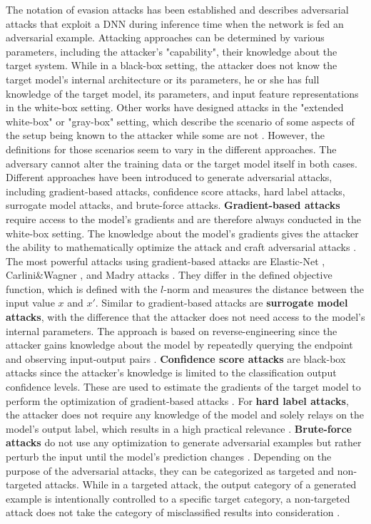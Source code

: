 The notation of evasion attacks has been established and describes adversarial attacks that exploit a DNN during inference time when the network is fed an adversarial example. 
Attacking approaches can be determined by various parameters, including the attacker's "capability", their knowledge about the target system. While in a black-box setting, the attacker does not know the target model's internal architecture or its parameters, he or she has full knowledge of the target model, its parameters, and input feature representations in the white-box setting. Other works have designed attacks in the "extended white-box" or "gray-box" setting, which describe the scenario of some aspects of the setup being known to the attacker while some are not \cite{vivek2018gray}. However, the definitions for those scenarios seem to vary in the different approaches.
The adversary cannot alter the training data or the target model itself in both cases.
Different approaches have been introduced to generate adversarial attacks, including gradient-based attacks, confidence score attacks, hard label attacks, surrogate model attacks, and brute-force attacks. \textbf{Gradient-based attacks} require access to the model's gradients and are therefore always conducted in the white-box setting. The knowledge about the model's gradients gives the attacker the ability to mathematically optimize the attack and craft adversarial attacks \cite{carlini2017adversarial}. The most powerful attacks using gradient-based attacks are Elastic-Net \cite{chen2017ead}, Carlini\&Wagner \cite{carlini2017adversarial}, and Madry attacks \cite{madry2017towards}. They differ in the defined objective function, which is defined with the $l$-norm and measures the distance between the input value \(x\) and \(x'\). Similar to gradient-based attacks are \textbf{surrogate model attacks}, with the difference that the attacker does not need access to the model's internal parameters. The approach is based on reverse-engineering since the attacker gains knowledge about the model by repeatedly querying the endpoint and observing input-output pairs \cite{uesato2018adversarial}. 
\textbf{Confidence score attacks} are black-box attacks since the attacker's knowledge is limited to the classification output confidence levels. These are used to estimate the gradients of the target model to perform the optimization of gradient-based attacks \cite{chen2017zoo, ilyas2018black}. For \textbf{hard label attacks}, the attacker does not require any knowledge of the model and solely relays on the model's output label, which results in a high practical relevance \cite{brendel2017decision}. \textbf{Brute-force attacks} do not use any optimization to generate adversarial examples but rather perturb the input until the model's prediction changes \cite{engstrom2019exploring, hendrycks2018benchmarking, ford2019adversarial}. 
Depending on the purpose of the adversarial attacks, they can be categorized as targeted and non-targeted attacks. While in a targeted attack, the output category of a generated example is intentionally controlled to a specific target category, a non-targeted attack does not take the category of misclassified results into consideration \cite{vijayaraghavan2019generating}.

